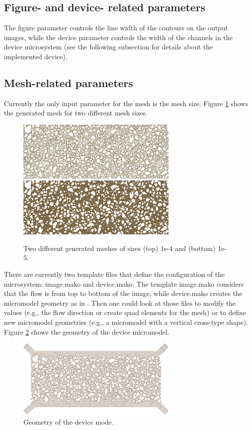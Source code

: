 \documentclass[10pt]{article}
\begin{document}
\subsection{Figure- and device- related parameters}
The figure parameter controls the line width of the contours on the output images, while the device parameter controls the width of the channels in the device microsystem (see the following subsection for details about the implemented device).

\subsection{Mesh-related parameters}
Currently the only input parameter for the mesh is the mesh size. Figure \ref{mesh} shows the generated mesh for two different mesh sizes.
\begin{figure}[h!]
\centering
\includegraphics[width=0.7\textwidth]{mesh_1e4.png}
\includegraphics[width=0.7\textwidth]{mesh_1e5.png}
\caption{Two different generated meshes of sizes (top) 1e-4 and (bottom) 1e-5.}
\label{mesh} 
\end{figure}

There are currently two template files that define the configuration of the microsystem: image.mako and device.mako. The template image.mako considers that the flow is from top to bottom of the image, while device.mako creates the micromodel geometry as in \cite{Benali2019,Liu2022}. Then one could look at those files to modify the values (e.g., the flow direction or create quad elements for the mesh) or to define new micromodel geometries (e.g., a micromodel with a vertical cross-type shape). Figure \ref{modes} shows the geometry of the device micromodel.
\begin{figure}[h!]
\centering
\includegraphics[width=0.7\textwidth]{device.png}
\caption{Geometry of the device mode.}
\label{modes} 
\end{figure}
\end{document}
